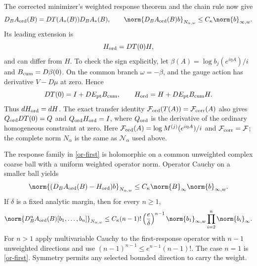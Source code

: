 The corrected minimizer's weighted response theorem and the chain
rule now give
\begin{equation}\label{or-first}
 D_BA_{\rm ord}(B)=DT(A_*(B))D_BA_*(B),\qquad
 \norm{D_BA_{\rm ord}(B)b}_{N_{\alpha,w}}
                 \le C_\kappa\norm{b}_{\infty,w}.
\end{equation}
Its leading extension is
\begin{equation}\label{or-leading}
 H_{\rm ord}=DT(0)H,
\end{equation}
and can differ from $H$. To check the sign explicitly, let
$\beta(A)=\log b_j(e^{i\eta A})/i$ and
$B_{\rm cum}=D\beta(0)$. On the common branch $\omega=-\beta$,
and the gauge action has derivative $V-D\mu$ at zero. Hence
\begin{equation}\label{or-leading-explicit}
 DT(0)=I+DE_{\rm pt}B_{\rm cum},\qquad
 H_{\rm ord}=H+DE_{\rm pt}B_{\rm cum}H.
\end{equation}
Thus $dH_{\rm ord}=dH$.
The exact transfer identity
$\mathcal F_{\rm ord}(T(A))=\mathcal F_{\rm corr}(A)$
also gives $Q_{\rm ord}DT(0)=Q$ and
$Q_{\rm ord}H_{\rm ord}=I$, where $Q_{\rm ord}$ is the
derivative of the ordinary homogeneous constraint at zero.
Here $\mathcal F_{\rm ord}(A)=\log M^{(j)}(e^{i\eta A})/i$
and $\mathcal F_{\rm corr}=\mathcal F$; the complete norm
$N_\alpha$ is the same as $\mathcal N_\alpha$ used above.

The response family in \eqref{or-first} is holomorphic on a
common unweighted complex coarse ball with a uniform weighted
operator norm. Operator Cauchy on a smaller ball yields
\begin{equation}\label{or-linear-correction}
 \norm{(D_BA_{\rm ord}(B)-H_{\rm ord})b}_{N_{\alpha,w}}
       \le C_\kappa\norm{B}_\infty\norm{b}_{\infty,w}.
\end{equation}
If $\delta$ is a fixed analytic margin, then for every $n\ge1$,
\begin{equation}\label{or-higher}
 \norm{D_B^nA_{\rm ord}(B)[b_1,\ldots,b_n]}_{N_{\alpha,w}}
 \le C_\kappa(n-1)!\left(\frac e\delta\right)^{n-1}
       \norm{b_1}_{\infty,w}\prod_{i=2}^n\norm{b_i}_\infty.
\end{equation}
For $n>1$ apply multivariable Cauchy to the first-response
operator with $n-1$ unweighted directions and use
$(n-1)^{n-1}\le e^{n-1}(n-1)!$. The case $n=1$ is
\eqref{or-first}. Symmetry permits any selected bounded direction
to carry the weight.

